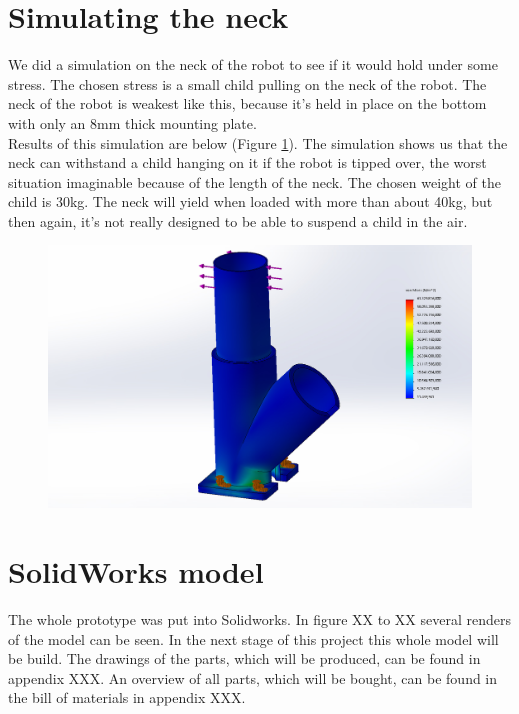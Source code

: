 \documentclass[11pt,twoside,a4paper]{report}
\begin{document}
\section{Simulating the neck}
We did a simulation on the neck of the robot to see if it would hold under some stress. The chosen stress is a small child pulling on the neck of the robot. The neck of the robot is weakest like this, because it\rq{}s held in place on the bottom with only an 8mm thick mounting plate.\\
Results of this simulation are below (Figure \ref{fig:simluation}). The simulation shows us that the neck can withstand a child hanging on it if the robot is tipped over, the worst situation imaginable because of the length of the neck. The chosen weight of the child is 30kg. The neck will yield when loaded with more than about 40kg, but then again, it\rq{}s not really designed to be able to suspend a child in the air.

\begin{figure}[!htb]
\begin{center}
\includegraphics[width=14cm]{Images/result_simulation.jpg}
\caption{ }
\label{fig:simluation}
\end{center}
\end{figure}
\label{sect:NeckSim}
\section{SolidWorks model}
The whole prototype was put into Solidworks. In figure XX to XX several renders of the model can be seen. In the next stage of this project this whole model will be build. The drawings of the parts, which will be produced, can be found in appendix XXX. An overview of all parts, which will be bought, can be found in the bill of materials in appendix XXX. 
\end{document}
